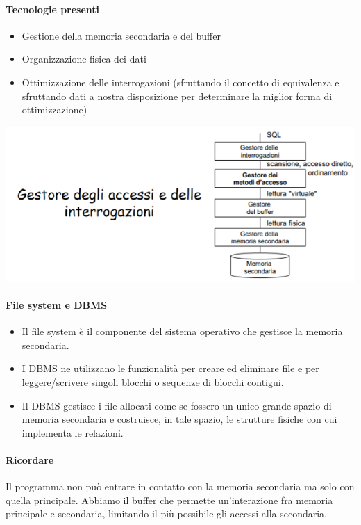 \paragraph{Tecnologie presenti}
\begin{itemize}
	\item Gestione della memoria secondaria e del buffer
	\item Organizzazione fisica dei dati
	\item Ottimizzazione delle interrogazioni (sfruttando il concetto di equivalenza e sfruttando dati a nostra disposizione per determinare la miglior forma di ottimizzazione)
\end{itemize}
\begin{center}\includegraphics{images/175.PNG}\end{center}
\paragraph{File system e DBMS}
\begin{itemize}
	\item Il file system è il componente del sistema operativo che gestisce la memoria secondaria.
	\item I DBMS ne utilizzano le funzionalità per creare ed eliminare file e per leggere/scrivere singoli blocchi o sequenze di blocchi contigui. 
	\item Il DBMS gestisce i file allocati come se fossero un unico grande spazio di memoria secondaria e costruisce, in tale spazio, le strutture fisiche con cui implementa le relazioni.
\end{itemize}
\paragraph{Ricordare} Il programma non può entrare in contatto con la memoria secondaria ma solo con quella principale. Abbiamo il buffer che permette un'interazione fra memoria principale e secondaria, limitando il più possibile gli accessi alla secondaria.
